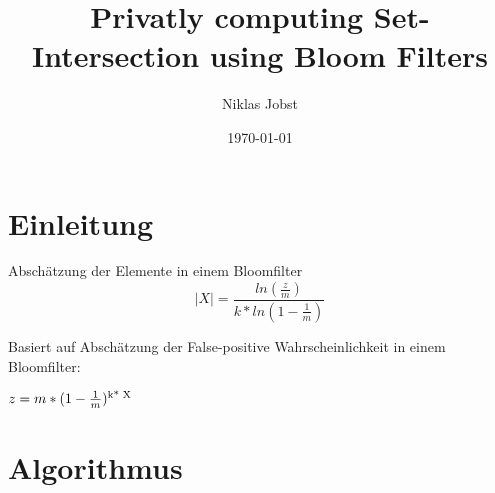 \documentclass{beamer}
\title[Privatly computing Set-Intersection]{Privatly computing Set-Intersection using Bloom Filters}
\author{Niklas Jobst}
\institute{TCS - Universität zu Lübeck}
\date{\today}
\begin{document}
\section{Einleitung}
\begin{frame}{Abschätzung der Elemente in einem Bloomfilter}
	$$ |X| = \frac{ln( \frac{z}{m})}{k* ln(1- \frac{1}{m})}$$
	
	\begin{arrowlist}
		\item Basiert auf Abschätzung der False-positive Wahrscheinlichkeit in einem Bloomfilter:
		\item 	$ z = m*(1 -\frac{1}{m})\textsuperscript{k* X}$ 
	\end{arrowlist}
	
\end{frame}

\section{Algorithmus}
\end{document}
